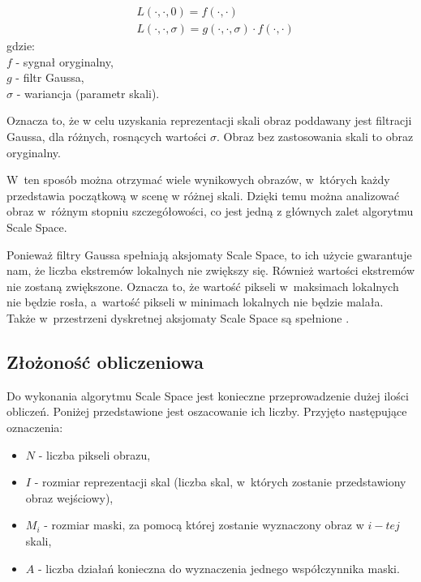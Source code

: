 \begin{equation}
\label{eq:scalespace}
\begin{split}
& L(\cdot,\cdot,0) = f(\cdot,\cdot) \\
& L(\cdot,\cdot,\sigma) = g(\cdot,\cdot,\sigma)\cdot f(\cdot,\cdot)
\end{split}
\end{equation}
gdzie:\\
$ f $ - sygnał oryginalny, \\
$ g $ - filtr Gaussa, \\
$ \sigma $ - wariancja (parametr skali).

Oznacza to, że w celu uzyskania reprezentacji skali obraz poddawany jest filtracji Gaussa, dla różnych, rosnących wartości $ \sigma $. Obraz bez zastosowania skali to obraz oryginalny.

W~ten sposób można otrzymać wiele wynikowych obrazów, w~których każdy przedstawia początkową w scenę w różnej skali. Dzięki temu można analizować obraz w~różnym stopniu szczegółowości, co jest jedną z głównych zalet algorytmu Scale Space.

Ponieważ filtry Gaussa spełniają aksjomaty Scale Space, to ich użycie gwarantuje nam, że liczba ekstremów lokalnych nie zwiększy się. Również wartości ekstremów nie zostaną zwiększone. Oznacza to, że wartość pikseli w~maksimach lokalnych nie będzie rosła, a~wartość pikseli w minimach lokalnych nie będzie malała. Także w~przestrzeni dyskretnej aksjomaty Scale Space są spełnione \cite{SSFDS}.


\subsection{Złożoność obliczeniowa}
\label{subsec:zlozonosc_obliczeniowa}

Do wykonania algorytmu Scale Space jest konieczne przeprowadzenie dużej ilości obliczeń. Poniżej przedstawione jest oszacowanie ich liczby. Przyjęto następujące oznaczenia:
\begin{itemize}
\item $ N $ - liczba pikseli obrazu,
\item $ I $ - rozmiar reprezentacji skal (liczba skal, w~których zostanie przedstawiony obraz wejściowy),
\item $ M_i $ - rozmiar maski, za pomocą której zostanie wyznaczony obraz w $ i-tej $ skali,
\item $ A $ - liczba działań konieczna do wyznaczenia jednego współczynnika maski.
\end{itemize}

